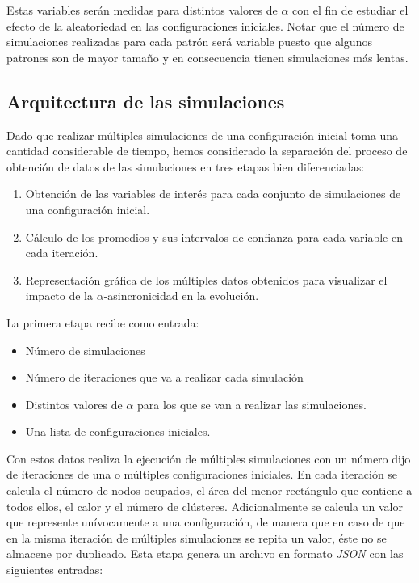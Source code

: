 \documentclass[../proyecto.tex]{memoir}
\begin{document}
Estas variables serán medidas para distintos valores de $\alpha$ con el fin de estudiar el efecto de la aleatoriedad en las configuraciones iniciales. Notar que el número de simulaciones realizadas para cada patrón será variable puesto que algunos patrones son de mayor tamaño y en consecuencia tienen simulaciones más lentas.

\subsection{Arquitectura de las simulaciones}

Dado que realizar múltiples simulaciones de una configuración inicial toma una cantidad considerable de tiempo, hemos considerado la separación del proceso de obtención de datos de las simulaciones en tres etapas bien diferenciadas:
\begin{enumerate}
\item Obtención de las variables de interés para cada conjunto de simulaciones de una configuración inicial.
\item Cálculo de los promedios y sus intervalos de confianza para cada variable en cada iteración.
\item Representación gráfica de los múltiples datos obtenidos para visualizar el impacto de la $\alpha$-asincronicidad en la evolución.
\end{enumerate}

La primera etapa recibe como entrada: \begin{itemize}
\item Número de simulaciones
\item Número de iteraciones que va a realizar cada simulación
\item Distintos valores de $\alpha$ para los que se van a realizar las simulaciones.
\item Una lista de configuraciones iniciales.
\end{itemize}

Con estos datos realiza la ejecución de múltiples simulaciones con un número dijo de iteraciones de una o múltiples configuraciones iniciales. En cada iteración se calcula el número de nodos ocupados, el área del menor rectángulo que contiene a todos ellos, el calor y el número de clústeres. Adicionalmente se calcula un valor que represente unívocamente a una configuración, de manera que en caso de que en la misma iteración de múltiples simulaciones se repita un valor, éste no se almacene por duplicado. Esta etapa genera un archivo en formato \textit{JSON} \cite{json} con las siguientes entradas:
\end{document}
